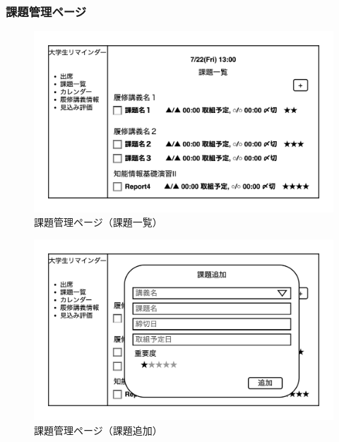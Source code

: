 \documentclass[a4paper, 11pt, titlepage]{jsarticle}
\begin{document}
\subsubsection{課題管理ページ}
\begin{figure}[htbp]
\begin{center}
\includegraphics[width=120mm]{../img/Task1.png}
\caption{課題管理ページ（課題一覧）}
\end{center}
\end{figure}
\begin{figure}[htbp]
\begin{center}
\includegraphics[width=120mm]{../img/Task2.png}
\caption{課題管理ページ（課題追加）}
\end{center}
\end{figure}

\clearpage
\end{document}
